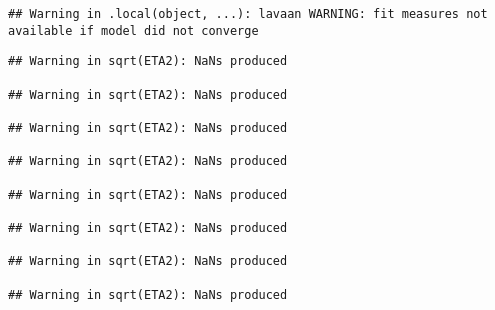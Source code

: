 \documentclass[
]{article}
\begin{document}
\begin{verbatim}
## Warning in .local(object, ...): lavaan WARNING: fit measures not available if model did not converge
\end{verbatim}

\begin{verbatim}
## Warning in sqrt(ETA2): NaNs produced

## Warning in sqrt(ETA2): NaNs produced

## Warning in sqrt(ETA2): NaNs produced

## Warning in sqrt(ETA2): NaNs produced

## Warning in sqrt(ETA2): NaNs produced

## Warning in sqrt(ETA2): NaNs produced

## Warning in sqrt(ETA2): NaNs produced

## Warning in sqrt(ETA2): NaNs produced
\end{verbatim}
\end{document}
